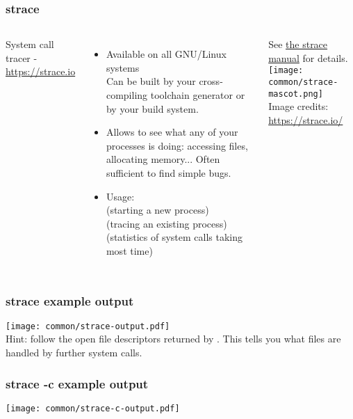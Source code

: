 \begin{frame}[fragile]
  \frametitle{strace}
  \begin{columns}
  \small
  System call tracer - \url{https://strace.io}
  \begin{itemize}
  \item Available on all GNU/Linux systems\\
        Can be built by your cross-compiling toolchain generator or by your build system.
  \item Allows to see what any of your processes is doing: accessing files, allocating memory...
        Often sufficient to find simple bugs.
  \item Usage:\\
     (starting a new process)\\
     (tracing an existing process)\\
     (statistics of system calls taking most time)
  \end{itemize}
  See \href{https://man7.org/linux/man-pages/man1/strace.1.html}{the strace manual} for details.
  \texttt{[image: common/strace-mascot.png]}\\
  \tiny Image credits: \url{https://strace.io/}
  \end{columns}
\end{frame}

\begin{frame}[fragile]
  \frametitle{strace example output}
  \texttt{[image: common/strace-output.pdf]}\\
  Hint: follow the open file descriptors returned by .
  This tells you what files are handled by further system calls.
\end{frame}

\begin{frame}[fragile]
  \frametitle{strace -c example output}
  \texttt{[image: common/strace-c-output.pdf]}
\end{frame}
